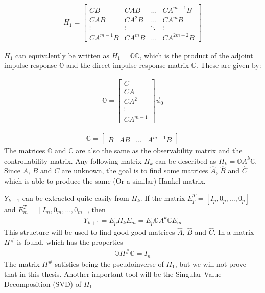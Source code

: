 \begin{align}
    H_1 = 
    \begin{bmatrix}
        CB & CAB & \dots & CA^{m-1}B\\ 
        CAB & CA^2B & \dots & CA^{m}B\\
        \vdots & \vdots & \ddots & \vdots\\
        CA^{m-1}B & CA^{m}B & \dots & CA^{2m-2}B
    \end{bmatrix} 
\end{align}
 
\noindent
$H_1$ can equivalently be written as $H_1 = \mathbb{O}\mathbb{C}$, which is the product of the adjoint impulse response $\mathbb{O}$ and the direct impulse response matrix $\mathbb{C}$. These are given by:

\begin{align}
\mathbb{O} = 
\begin{bmatrix}
    C \\ CA \\ CA^2 \\ \vdots \\ CA^{m-1}
\end{bmatrix}
\vec{u}_0
\end{align}

\begin{align}
\mathbb{C} = 
\begin{bmatrix}
    B & AB& \dots & A^{m-1}B
\end{bmatrix}                             
\end{align}
The matrices $\mathbb{O}$ and $\mathbb{C}$ are also the same as the observability matrix and the controllability matrix. Any following matrix $H_k$ can be described as $H_k = \mathbb{O}A^k \mathbb{C}$.
Since $A$, $B$ and $C$ are unknown, the goal is to find some matrices $\hat{A}$, $\hat{B}$ and $\hat{C}$ which is able to produce the same (Or a similar) Hankel-matrix.  

\noindent
$Y_{k+1}$ can be extracted quite easily from $H_k$. If the matrix $E_p^T = \left[ I_p, 0_p, \dots, 0_p \right]$ and $E_m^T = \left[ I_m, 0_m, \dots, 0_m \right]$, then 
\begin{align}
    Y_{k+1} = E_p H_k E_m = E_p \mathbb{O}  A^k \mathbb{C}  E_m
    \label{eq:magic_eq_1}
\end{align}
This structure will be used to find good good matrices $\hat{A}$, $\hat{B}$ and $\hat{C}$. 
\noindent
In \cite{ERA_source} a matrix $H^\#$ is found, which has the properties 
\begin{align}
    \mathbb{O} H^\# \mathbb{C} = I_n 
    \label{eq:H_sharp_cancelation}
\end{align}
The matrix $H^\#$ satisfies being the pseudoinverse of $H_1$, but we will not prove that in this thesis.
\noindent
Another important tool will be the Singular Value Decomposition (SVD) of $H_1$


